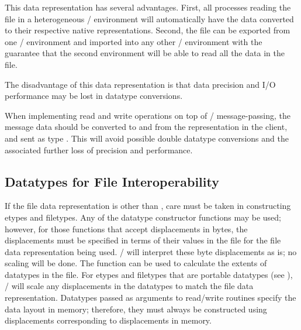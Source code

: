\begin{description}
This data representation has several advantages.
First, all processes reading the
file in a heterogeneous \MPI/ environment will automatically have the
data converted to their respective native representations.
Second, the file can be exported from one \MPI/ environment
and imported into any other \MPI/ environment
with the guarantee that the second environment will be able
to read all the data in the file.

The disadvantage of this data representation is that data precision and I/O
performance may be lost in datatype conversions.

\begin{implementors}
When implementing read and write operations
on top of \MPI/ message-passing, the message data should be converted
to and from the  representation in the client,
and sent as type .
This will avoid possible double datatype conversions
and the associated further loss of precision and performance.
\end{implementors}

\end{description}

\subsection{Datatypes for File Interoperability}
\label{subsec:io-interop}

If the file data representation is other than , care
must be taken in constructing etypes and filetypes.  Any of the
datatype constructor functions may be used; however, for those
functions that accept displacements in bytes, the displacements
must be specified in terms of their values in the file for the 
file data representation being used.
\MPI/ will interpret these byte displacements as is;
no scaling will be done.
The function
 can be used to calculate
the extents of datatypes in the file.  
For etypes and filetypes that are portable datatypes
(see ),
\MPI/ will scale any displacements in the datatypes
to match the file data representation.
Datatypes passed as 
arguments to read/write routines specify the data layout in
memory; therefore, they must always be constructed using
displacements corresponding to displacements in memory.

